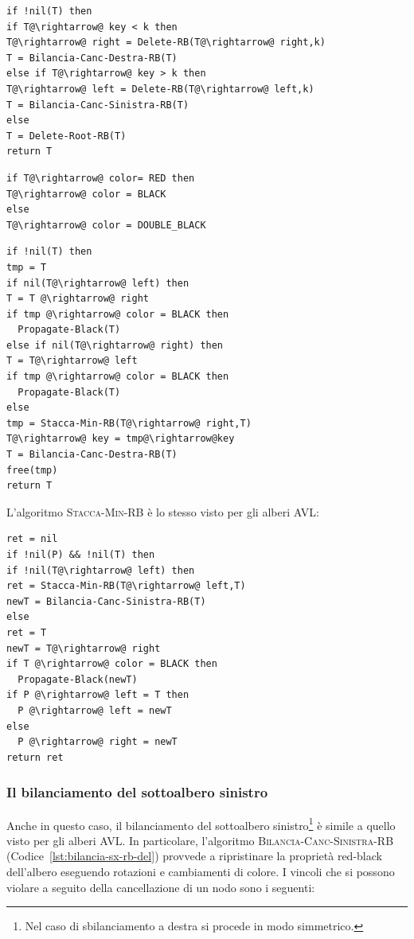 \begin{minipage}{.45\textwidth}
\begin{lstlisting}[language=asd,caption={Delete-RB(T,k)},label=lst:delete-rb]
if !nil(T) then
if T@\rightarrow@ key < k then
T@\rightarrow@ right = Delete-RB(T@\rightarrow@ right,k)
T = Bilancia-Canc-Destra-RB(T)
else if T@\rightarrow@ key > k then
T@\rightarrow@ left = Delete-RB(T@\rightarrow@ left,k)
T = Bilancia-Canc-Sinistra-RB(T)
else
T = Delete-Root-RB(T)
return T
\end{lstlisting}

\begin{lstlisting}[language=asd,caption={Propagate-Black(T)},label=lst:propagate-black]
if T@\rightarrow@ color= RED then
T@\rightarrow@ color = BLACK
else
T@\rightarrow@ color = DOUBLE_BLACK
\end{lstlisting}
\end{minipage}
\hfil
\begin{minipage}{.4\textwidth}
\begin{lstlisting}[language=asd,caption={Delete-Root-RB(T)},label=lst:delete-root-rb]
if !nil(T) then
tmp = T
if nil(T@\rightarrow@ left) then
T = T @\rightarrow@ right
if tmp @\rightarrow@ color = BLACK then
  Propagate-Black(T)
else if nil(T@\rightarrow@ right) then
T = T@\rightarrow@ left
if tmp @\rightarrow@ color = BLACK then
  Propagate-Black(T)
else
tmp = Stacca-Min-RB(T@\rightarrow@ right,T)
T@\rightarrow@ key = tmp@\rightarrow@key
T = Bilancia-Canc-Destra-RB(T)
free(tmp)
return T
\end{lstlisting}
\end{minipage}

L'algoritmo \textsc{Stacca-Min-RB} è lo stesso visto per gli alberi AVL:
\begin{lstlisting}[language=asd,caption={Stacca-Min-RB(T,P)},label=lst:stacca-min-rb]
ret = nil
if !nil(P) && !nil(T) then
if !nil(T@\rightarrow@ left) then
ret = Stacca-Min-RB(T@\rightarrow@ left,T)
newT = Bilancia-Canc-Sinistra-RB(T)
else
ret = T
newT = T@\rightarrow@ right
if T @\rightarrow@ color = BLACK then
  Propagate-Black(newT)
if P @\rightarrow@ left = T then
  P @\rightarrow@ left = newT
else
  P @\rightarrow@ right = newT
return ret
\end{lstlisting}

\subsubsection{Il bilanciamento del sottoalbero sinistro}
Anche in questo caso, il bilanciamento del sottoalbero sinistro\footnote{Nel caso di sbilanciamento a destra si procede in modo simmetrico.} è simile a quello visto per gli alberi AVL. In particolare, l'algoritmo \textsc{Bilancia-Canc-Sinistra-RB} (Codice~\ref{lst:bilancia-sx-rb-del}) provvede a ripristinare la proprietà red-black dell'albero  eseguendo rotazioni e cambiamenti di colore. I vincoli che si possono violare a seguito della cancellazione di un nodo sono i seguenti:

